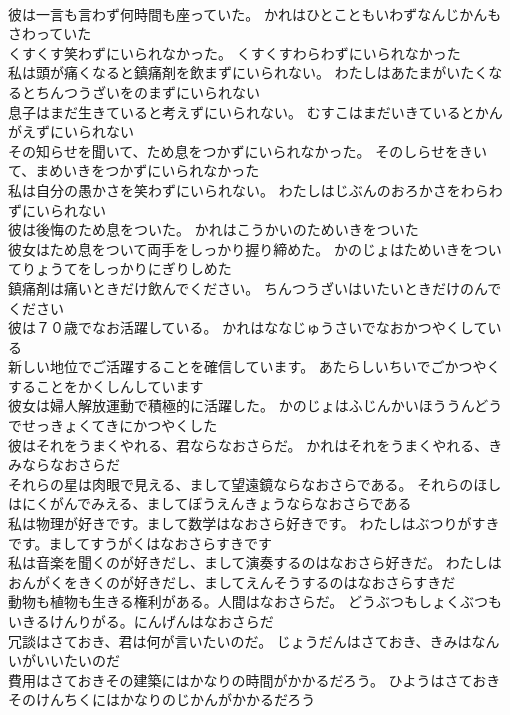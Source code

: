 \documentclass[8pt]{extreport}
\begin{document}
\begin{CJK}{UTF8}{min}
\\	彼は一言も言わず何時間も座っていた。	かれはひとこともいわずなんじかんもさわっていた 
\\	くすくす笑わずにいられなかった。	くすくすわらわずにいられなかった 
\\	私は頭が痛くなると鎮痛剤を飲まずにいられない。	わたしはあたまがいたくなるとちんつうざいをのまずにいられない 
\\	息子はまだ生きていると考えずにいられない。	むすこはまだいきているとかんがえずにいられない 
\\	その知らせを聞いて、ため息をつかずにいられなかった。	そのしらせをきいて、まめいきをつかずにいられなかった 
\\	私は自分の愚かさを笑わずにいられない。	わたしはじぶんのおろかさをわらわずにいられない 
\\	彼は後悔のため息をついた。	かれはこうかいのためいきをついた 
\\	彼女はため息をついて両手をしっかり握り締めた。	かのじょはためいきをついてりょうてをしっかりにぎりしめた 
\\	鎮痛剤は痛いときだけ飲んでください。	ちんつうざいはいたいときだけのんでください 
\\	彼は７０歳でなお活躍している。	かれはななじゅうさいでなおかつやくしている 
\\	新しい地位でご活躍することを確信しています。	あたらしいちいでごかつやくすることをかくしんしています 
\\	彼女は婦人解放運動で積極的に活躍した。	かのじょはふじんかいほううんどうでせっきょくてきにかつやくした 
\\	彼はそれをうまくやれる、君ならなおさらだ。	かれはそれをうまくやれる、きみならなおさらだ 
\\	それらの星は肉眼で見える、まして望遠鏡ならなおさらである。	それらのほしはにくがんでみえる、ましてぼうえんきょうならなおさらである 
\\	私は物理が好きです。まして数学はなおさら好きです。	わたしはぶつりがすきです。ましてすうがくはなおさらすきです 
\\	私は音楽を聞くのが好きだし、まして演奏するのはなおさら好きだ。	わたしはおんがくをきくのが好きだし、ましてえんそうするのはなおさらすきだ 
\\	動物も植物も生きる権利がある。人間はなおさらだ。	どうぶつもしょくぶつもいきるけんりがる。にんげんはなおさらだ 
\\	冗談はさておき、君は何が言いたいのだ。	じょうだんはさておき、きみはなんいがいいたいのだ 
\\	費用はさておきその建築にはかなりの時間がかかるだろう。	ひようはさておきそのけんちくにはかなりのじかんがかかるだろう 

\end{CJK}
\end{document}
